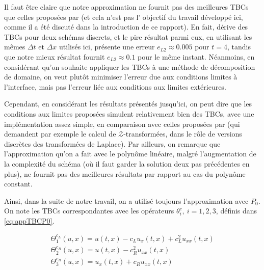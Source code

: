\indent Il faut être claire que notre approximation ne fournit pas des meilleures TBCs que celles proposées par \cite{besse2015} (et cela n'est pas l' objectif du travail développé ici, comme il a été discuté dans la introduction de ce rapport). En fait, \cite{besse2015} dérive des TBCs pour deux schémas discrets, et le pire résultat parmi eux, en utilisant les mêmes $\Delta t$ et $\Delta x$ utilisés ici, présente une erreur $e_{L2} \approx 0.005$ pour $t = 4$, tandis que notre mieux résultat fournit $e_{L2} \approx 0.1$ pour le même instant. Néanmoins, en considérant qu'on souhaite appliquer les TBCs à une méthode de décomposition de domaine, on veut plutôt minimiser l'erreur due aux conditions limites à l'interface, mais pas l'erreur liée aux conditions aux limites extérieures.

\indent Cependant, en considérant les résultats présentés jusqu'ici, on peut dire que les conditions aux limites proposées simulent relativement bien des TBCs, avec une implémentation assez simple, en comparaison avec celles proposées par \cite{besse2015} (qui demandent par exemple le calcul de $\mathcal{Z}$-transformées, dans le rôle de versions discrètes des transformées de Laplace). Par ailleurs, on remarque que l'approximation qu'on a fait avec le polynôme linéaire, malgré l'augmentation de la complexité du schéma (où il faut garder la solution deux pas précédentes en plus), ne fournit pas des meilleures résultats par rapport au cas du polynôme constant.

\indent Ainsi, dans la suite de notre travail, on a utilisé toujours l'approximation avec $P_0$. On note les TBCs correspondantes avec les opérateurs $\theta_i^c, \ i=1,2,3$, définis dans \eqref{eq:appTBCP0}.

\begin{equation*}
    \begin{gathered}
        \Theta_1^{c_L}(u,x) = u(t,x) - c_L u_x(t,x)  + c_L^2  u_{xx}(t,x) \\
        \Theta_2^{c_R}(u,x) =  u(t,x) - c_R^2    u_{xx}(t,x)\\
        \Theta_3^{c_R} (u,x)= u_x(t,x) + c_R u_{xx}(t,x) 
    \end{gathered}
\end{equation*}